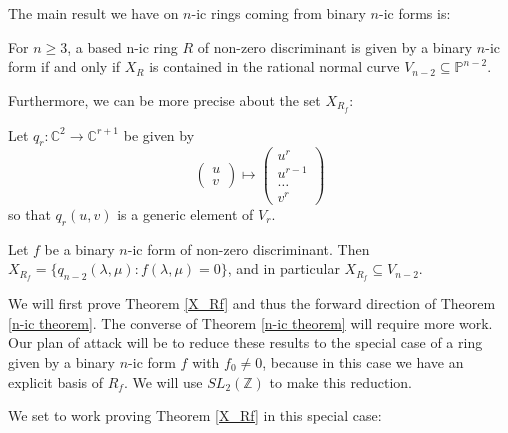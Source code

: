 \documentclass{report}
\begin{document}
The main result we have on $n$-ic rings coming from binary $n$-ic forms is:

\begin{theorem} \label{n-ic theorem}
For $n \geq 3$, a based n-ic ring $R$ of non-zero discriminant is given by a binary $n$-ic form if and only if $X_R$ is contained in the rational normal curve $V_{n-2} \subseteq \mathbb{P}^{n-2}$.
\end{theorem}

Furthermore, we can be more precise about the set $X_{R_f}$:
\begin{definition}
Let $q_r : \mathbb{C}^2 \to \mathbb{C}^{r+1}$ be given by
\begin{equation}
\begin{pmatrix} u \\ v \end{pmatrix} \mapsto \begin{pmatrix} u^r \\ u^{r-1} \\ \ldots \\ v^r \end{pmatrix}
\end{equation}
so that $q_r(u,v)$ is a generic element of $V_r$.
\end{definition}

\begin{theorem}  \label{X_Rf}
Let $f$ be a binary $n$-ic form of non-zero discriminant.  Then $X_{R_f} = \{ q_{n-2}(\lambda , \mu) : f( \lambda, \mu ) = 0 \}$, and in particular $X_{R_f} \subseteq V_{n-2}$.
\end{theorem}

We will first prove Theorem \ref{X_Rf} and thus the forward direction of Theorem \ref{n-ic theorem}.  The converse of Theorem \ref{n-ic theorem} will require more work.  Our plan of attack will be to reduce these results to the special case of a ring given by a binary $n$-ic form $f$ with $f_0 \neq 0$, because in this case we have an explicit basis of $R_f$.  We will use $SL_2(\mathbb{Z})$ to make this reduction.

We set to work proving Theorem \ref{X_Rf} in this special case:
\end{document}
